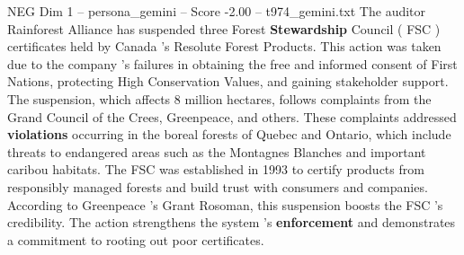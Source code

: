 \begin{textsample}{NEG Dim 1 – persona\_gemini – Score -2.00 – t974\_gemini.txt}  \label{ex:f1_neg_007}
The auditor Rainforest Alliance has suspended three Forest \textbf{Stewardship} Council ( FSC ) certificates held by Canada 's Resolute Forest Products.
This action was taken due to the company 's failures in obtaining the free and informed consent of First Nations, protecting High Conservation Values, and gaining stakeholder support.
The suspension, which affects 8 million hectares, follows complaints from the Grand Council of the Crees, Greenpeace, and others.
These complaints addressed \textbf{violations} occurring in the boreal forests of Quebec and Ontario, which include threats to endangered areas such as the Montagnes Blanches and important caribou habitats.
The FSC was established in 1993 to certify products from responsibly managed forests and build trust with consumers and companies.
According to Greenpeace 's Grant Rosoman, this suspension boosts the FSC 's credibility.
The action strengthens the system 's \textbf{enforcement} and demonstrates a commitment to rooting out poor certificates.

\end{textsample}
